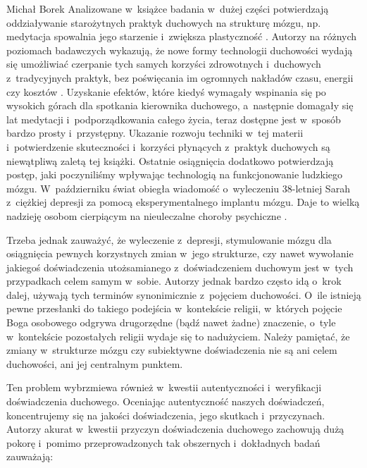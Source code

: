 \begin{newrevplenv}{Michał Borek}
Analizowane w~książce badania w~dużej części potwierdzają oddziaływanie starożytnych praktyk duchowych na strukturę mózgu, np. medytacja spowalnia jego starzenie i~zwiększa plastyczność
\parencite[][]{xiong_does_2009}. %
 Autorzy na różnych poziomach badawczych wykazują, że nowe formy technologii duchowości wydają się umożliwiać czerpanie tych samych korzyści zdrowotnych i~duchowych z~tradycyjnych praktyk, bez poświęcania im ogromnych nakładów czasu, energii czy kosztów 
\parencites[][]{baerentsen_investigation_2010}[][]{hasenkamp_effects_2012}[][]{xiong_does_2009}. %
 Uzyskanie efektów, które kiedyś wymagały wspinania się po wysokich górach dla spotkania kierownika duchowego, a~następnie domagały się lat medytacji i~podporządkowania całego życia, teraz dostępne jest w~sposób bardzo prosty i~przystępny. Ukazanie rozwoju techniki w~tej materii i~potwierdzenie skuteczności i~korzyści płynących z~praktyk duchowych są niewątpliwą zaletą tej książki. Ostatnie osiągnięcia dodatkowo potwierdzają postęp, jaki poczyniliśmy wpływając technologią na funkcjonowanie ludzkiego mózgu. W~październiku świat obiegła wiadomość o~wyleczeniu 38-letniej Sarah z~ciężkiej depresji za pomocą eksperymentalnego implantu mózgu. Daje to wielką nadzieję osobom cierpiącym na nieuleczalne choroby psychiczne 
\parencite[][]{wilson_womans_2021}.%


Trzeba jednak zauważyć, że wyleczenie z~depresji, stymulowanie mózgu dla osiągnięcia pewnych korzystnych zmian w~jego strukturze, czy nawet wywołanie jakiegoś doświadczenia utożsamianego z~doświadczeniem duchowym jest w~tych przypadkach celem samym w~sobie. Autorzy jednak bardzo często idą o~krok dalej, używają tych terminów synonimicznie z~pojęciem duchowości. O~ile istnieją pewne przesłanki do takiego podejścia w~kontekście religii, w~których pojęcie Boga osobowego odgrywa drugorzędne (bądź nawet żadne) znaczenie, o~tyle w~kontekście pozostałych religii wydaje się to nadużyciem. Należy pamiętać, że zmiany w~strukturze mózgu czy subiektywne doświadczenia nie są ani celem duchowości, ani jej centralnym punktem.

Ten problem wybrzmiewa również w~kwestii autentyczności i~weryfikacji doświadczenia duchowego. Oceniając autentyczność naszych doświadczeń, koncentrujemy się na jakości doświadczenia, jego skutkach i~przyczynach. Autorzy akurat w~kwestii przyczyn doświadczenia duchowego zachowują dużą pokorę i~pomimo przeprowadzonych tak obszernych i~dokładnych badań zauważają:


\end{newrevplenv}

